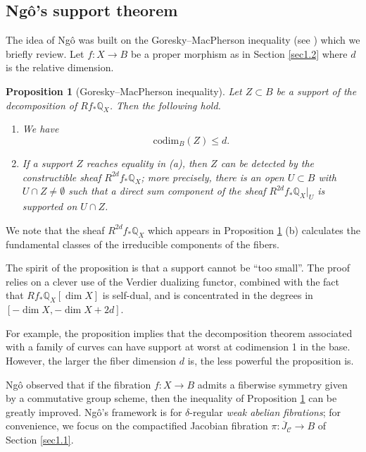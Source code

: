 \documentclass{pspum-l}
\theoremstyle{plain}
\newtheorem{prop}[thm]{Proposition}
\theoremstyle{definition}
\theoremstyle{remark}
\newcommand{\BQ}{{\mathbb{Q}}}
\newcommand{\CC}{{\mathcal C}}
\begin{document}
\subsection{Ng\^{o}'s support theorem}\label{sec1.3}


The idea of Ng\^o was built on the Goresky--MacPherson inequality (see \cite[Section 7]{Ngo}) which we briefly review. Let $f: X\to B$ be a proper morphism as in Section \ref{sec1.2} where $d$ is the relative dimension.


\begin{prop}[Goresky--MacPherson inequality]\label{prop1.2}
Let $Z \subset B$ be a support of the decomposition of $Rf_*\BQ_X$. Then the following hold.
\begin{enumerate}
    \item[(a)] We have
    \[
\mathrm{codim}_B(Z) \leq d.
\]
\item[(b)] If a support $Z$ reaches equality in (a), then $Z$ can be detected by the constructible sheaf $R^{2d}f_* \BQ_X$; more precisely, there is an open $U\subset B$ with $U\cap Z\neq \emptyset$ such that a direct sum component of the sheaf $R^{2d}f_*\BQ_X|_U$ is supported on $U\cap Z$.
\end{enumerate}

\end{prop}

We note that the sheaf $R^{2d}f_*\BQ_X$ which appears in Proposition \ref{prop1.2} (b) calculates the fundamental classes of the irreducible components of the fibers.


The spirit of the proposition is that a support cannot be ``too small''. The proof relies on a clever use of the Verdier dualizing functor, combined with the fact that $Rf_*\BQ_X[\dim X]$ is self-dual, and is concentrated in the degrees in $[-\dim X, -\dim X+2d]$.



For example, the proposition implies that the decomposition theorem associated with a family of curves can have support at worst at codimension 1 in the base. However, the larger the fiber dimension $d$ is, the less powerful the proposition is.

Ng\^o observed that if the fibration $f: X \to B$ admits a fiberwise symmetry given by a commutative group scheme, then the inequality of Proposition \ref{prop1.2} can be greatly improved. Ng\^o's framework is for $\delta$-regular \emph{weak abelian fibrations}; for convenience, we focus on the compactified Jacobian fibration $\pi: \overline{J}_\CC \to B$ of Section \ref{sec1.1}.
\end{document}
